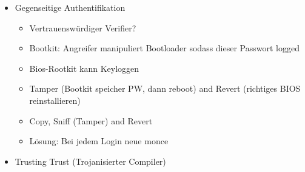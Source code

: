\documentclass[11pt, paper=a4, twocolumn]{scrartcl}
\begin{document}
\begin{itemize}
		\item Gegenseitige Authentifikation
			\begin{itemize}
				\item Vertrauenswürdiger Verifier?
				\item Bootkit: Angreifer manipuliert Bootloader sodass 
					dieser Passwort logged
				\item Bios-Rootkit kann Keyloggen
				\item Tamper (Bootkit speicher PW, dann reboot) and 
					Revert (richtiges BIOS reinstallieren)
				\item Copy, Sniff (Tamper) and Revert
				\item Lösung: Bei jedem Login neue monce
			\end{itemize}

		\item Trusting Trust (Trojanisierter Compiler)
	\end{itemize}
\end{document}
